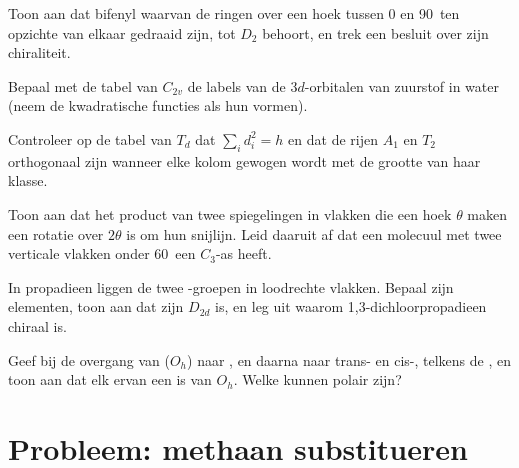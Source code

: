 \begin{exercise}[$\star\star$]\label{exo:b3:point-groups:7}
Toon aan dat bifenyl waarvan de ringen over een hoek tussen 0 en
90\textdegree\ ten opzichte van elkaar gedraaid zijn, tot $D_2$ behoort, en
trek een besluit over zijn chiraliteit.
\end{exercise}

\begin{exercise}[$\star\star$]\label{exo:b3:point-groups:8}
Bepaal met de tabel van $C_{2v}$ de labels van de $3d$-orbitalen van
zuurstof in water (neem de kwadratische functies als hun vormen).
\end{exercise}

\begin{exercise}[$\star\star$]\label{exo:b3:point-groups:9}
Controleer op de tabel van $T_d$ dat $\sum_id_i^2 = h$ en dat de rijen $A_1$ en $T_2$
orthogonaal zijn wanneer elke kolom gewogen wordt met de grootte van haar
klasse.
\end{exercise}

\begin{exercise}[$\star\star\star$]\label{exo:b3:point-groups:10}
Toon aan dat het product van twee spiegelingen in vlakken die een hoek
$\theta$ maken een rotatie over $2\theta$ is om hun snijlijn. Leid daaruit
af dat een molecuul met twee verticale vlakken onder 60\textdegree\ een $C_3$-as heeft.
\end{exercise}

\begin{exercise}[$\star\star\star$]\label{exo:b3:point-groups:11}
In propadieen  liggen de twee -groepen in loodrechte
vlakken. Bepaal zijn elementen, toon aan dat zijn  $D_{2d}$ is, en
leg uit waarom 1,3-dichloorpropadieen  chiraal is.
\end{exercise}

\begin{exercise}[$\star\star\star$]\label{exo:b3:point-groups:12}
Geef bij de overgang van  ($O_h$) naar , en daarna naar
trans- en
cis-, telkens de , en toon aan dat elk ervan een
 is van
$O_h$. Welke kunnen polair zijn?
\end{exercise}

\section{Probleem: methaan substitueren}

